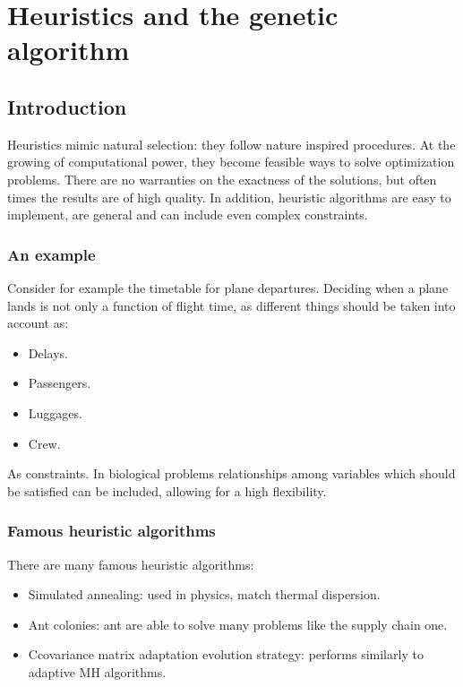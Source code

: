 \graphicspath{{chapters/12/images/}}
\chapter{Heuristics and the genetic algorithm}

\section{Introduction}
Heuristics mimic natural selection: they follow nature inspired procedures.
At the growing of computational power, they become feasible ways to solve optimization problems.
There are no warranties on the exactness of the solutions, but often times the results are of high quality.
In addition, heuristic algorithms are easy to implement, are general and can include even complex constraints.

  \subsection{An example}
  Consider for example the timetable for plane departures.
  Deciding when a plane lands is not only a function of flight time, as different things should be taken into account as:

  \begin{multicols}{4}
    \begin{itemize}
      \item Delays.
      \item Passengers.
      \item Luggages.
      \item Crew.
    \end{itemize}
  \end{multicols}

  As constraints.
  In biological problems relationships among variables which should be satisfied can be included, allowing for a high flexibility.

  \subsection{Famous heuristic algorithms}
  There are many famous heuristic algorithms:

  \begin{multicols}{2}
    \begin{itemize}
      \item Simulated annealing: used in physics, match thermal dispersion.
      \item Ant colonies: ant are able to solve many problems like the supply chain one.
      \item Ccovariance matrix adaptation evolution strategy: performs similarly to adaptive MH algorithms.
    \end{itemize}
  \end{multicols}


